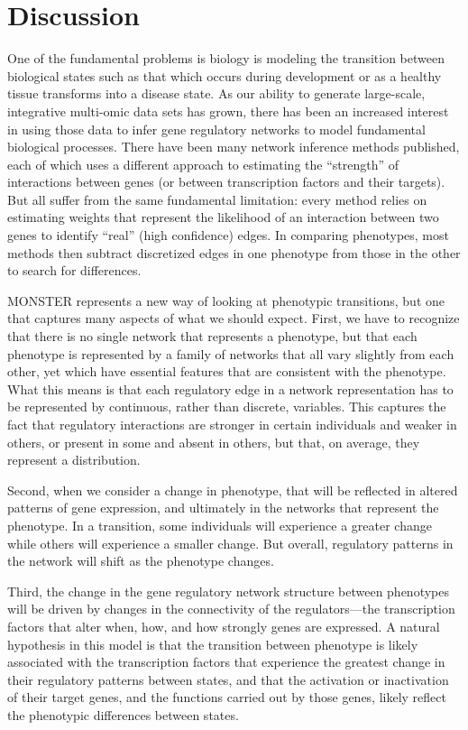 \section{Discussion}

One of the fundamental problems is biology is modeling the transition between biological states such as that which occurs during development or as a healthy tissue transforms into a disease state. As our ability to generate large-scale, integrative multi-omic data sets has grown, there has been an increased interest in using those data to infer gene regulatory networks to model fundamental biological processes. There have been many network inference methods published, each of which uses a different approach to estimating the ``strength'' of interactions between genes (or between transcription factors and their targets). But all suffer from the same fundamental limitation: every method relies on estimating weights that represent the likelihood of an interaction between two genes to identify ``real'' (high confidence) edges. In comparing phenotypes, most methods then subtract discretized edges in one phenotype from those in the other to search for differences.

MONSTER represents a  new way of looking at phenotypic transitions, but one that captures many aspects of what we should expect. First, we have to recognize that there is no single network that represents a phenotype, but that each phenotype is represented by a family of networks that all vary slightly from each other, yet which have essential features that are consistent with the phenotype. What this means is that each regulatory edge in a network representation has to be represented by continuous, rather than discrete, variables. This captures the fact that  regulatory interactions are stronger in certain individuals and weaker in others, or present in some and absent in others, but that, on average, they represent a distribution.

Second, when we consider a change in phenotype, that will be reflected in altered patterns of gene expression, and ultimately in the networks that represent the phenotype. In a transition, some individuals will experience a greater change while others will experience a smaller change. But overall, regulatory patterns in the network will shift as the phenotype changes. 

Third, the change in the gene regulatory network structure  between phenotypes will be driven by changes in the connectivity of the regulators---the transcription factors that alter when, how, and how strongly genes are expressed. A natural hypothesis in this model is that the transition between phenotype is likely associated with the transcription factors that experience the greatest change in their regulatory patterns between states, and that the activation or inactivation of their target genes, and the functions carried out by those genes, likely reflect the phenotypic differences between states.

